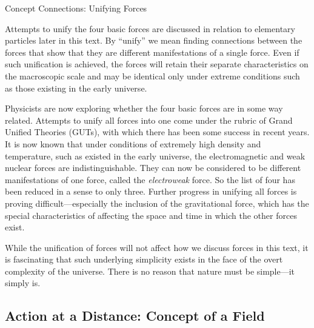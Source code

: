 \documentclass[
]{book}
\begin{document}
\hypertarget{fs-id2423408}{}
Concept Connections: Unifying Forces

Attempts to unify the four basic forces are discussed in relation to
elementary particles later in this text. By ``unify'' we mean finding
connections between the forces that show that they are different
manifestations of a single force. Even if such unification is achieved,
the forces will retain their separate characteristics on the macroscopic
scale and may be identical only under extreme conditions such as those
existing in the early universe.

Physicists are now exploring whether the four basic forces are in some
way related. Attempts to unify all forces into one come under the rubric
of Grand Unified Theories (GUTs), with which there has been some success
in recent years. It is now known that under conditions of extremely high
density and temperature, such as existed in the early universe, the
electromagnetic and weak nuclear forces are indistinguishable. They can
now be considered to be different manifestations of one force, called
the \emph{electroweak} force. So the list of four has been reduced in a sense
to only three. Further progress in unifying all forces is proving
difficult---especially the inclusion of the gravitational force, which
has the special characteristics of affecting the space and time in which
the other forces exist.

While the unification of forces will not affect how we discuss forces in
this text, it is fascinating that such underlying simplicity exists in
the face of the overt complexity of the universe. There is no reason
that nature must be simple---it simply is.

\hypertarget{import-auto-id3077454}{}
\hypertarget{action-at-a-distance-concept-of-a-field}{%
\subsection{Action at a Distance: Concept of a Field}\label{action-at-a-distance-concept-of-a-field}}
\end{document}
